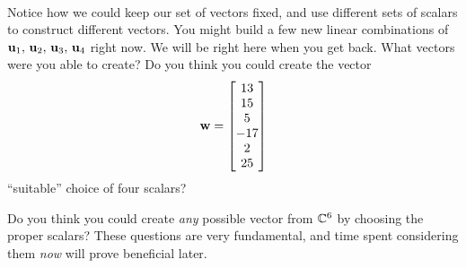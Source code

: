 \documentclass{ximera}
\begin{document}
\begin{example}
\begin{align*}
  \end{align*}
  Notice how we could keep our set of vectors fixed, and use different
  sets of scalars to construct different vectors.  You might build a
  few new linear combinations of
  $\mathbf{u}_1,\,\mathbf{u}_2,\,\mathbf{u}_3,\,\mathbf{u}_4$ right now.  We
  will be right here when you get back.  What vectors were you able to
  create?  Do you think you could create the vector 
  \[\mathbf{w}=\begin{bmatrix}13\\15\\5\\-17\\2\\25\end{bmatrix}\]
  ``suitable'' choice of four scalars?
  
  Do you think you could create \textit{any} possible vector from
  $\mathbb{C}^{6}$ by choosing the proper scalars?  These questions are
  very fundamental, and time spent considering them \textit{now} will
  prove beneficial later.
\end{example}
\end{document}

